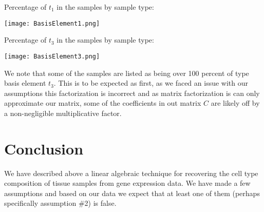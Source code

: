 \documentclass[10pt]{article}
\begin{document}
Percentage of \(t_1\) in the samples by sample type:

\begin{center}
\texttt{[image: BasisElement1.png]}
\end{center}

Percentage of \(t_3\) in the samples by sample type:

\begin{center}
\texttt{[image: BasisElement3.png]}
\end{center}

We note that some of the samples are listed as being over 100 percent of type basis element \(t_3\).
This is to be expected as first, as we faced an issue with our assumptions this factorization is incorrect and as matrix factorization is can only approximate our matrix, some of the coefficients in out matrix \(C\) are likely off by a non-negligible multiplicative factor.

\section{Conclusion}
We have described above a linear algebraic technique for recovering the cell type composition of tissue samples from gene expression data.
We have made a few assumptions and based on our data we expect that at least one of them (perhaps specifically assumption \#2) is false.
\end{document}
